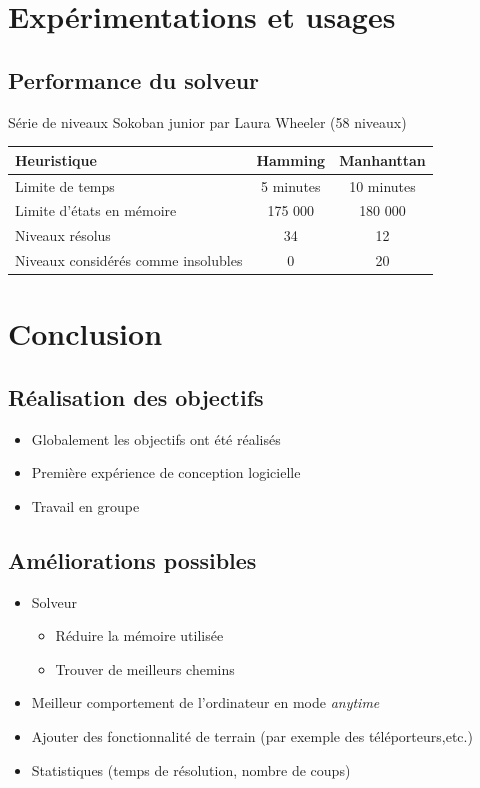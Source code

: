\documentclass{beamer}
\begin{document}
\section{Expérimentations et usages}
\subsection{Performance du solveur}
\begin{frame}
  Série de niveaux Sokoban junior par Laura Wheeler (58 niveaux)
  \centering
  \begin{tabular}{|l|c|c|}
  Heuristique                          & Hamming   & Manhanttan \\
  \hline
  Limite de temps                      & 5 minutes & 10 minutes \\
  \hline
  Limite d'états en mémoire            & 175 000   & 180 000    \\
  \hline
  Niveaux résolus                      &    34     &    12      \\
  \hline
  Niveaux considérés comme insolubles  &    0      &    20      \\
  \end{tabular}
\end{frame}

\section{Conclusion}
\subsection{Réalisation des objectifs}
\begin{frame}
\begin{itemize}
\item Globalement les objectifs ont été réalisés
\item Première expérience de conception logicielle
\item Travail en groupe
\end{itemize}
\end{frame}

\subsection{Améliorations possibles}
\begin{frame}
\begin{itemize}
\item Solveur
\begin{itemize}
\item Réduire la mémoire utilisée
\item Trouver de meilleurs chemins
\end{itemize}
\item Meilleur comportement de l'ordinateur en mode \textit{anytime}
\item Ajouter des fonctionnalité de terrain (par exemple des téléporteurs,etc.)
\item Statistiques (temps de résolution, nombre de coups)
\end{itemize}
\end{frame}
\end{document}
